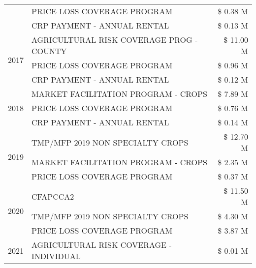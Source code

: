 \begin{tabular}{llr}
 & PRICE LOSS COVERAGE PROGRAM & \$ 0.38 M \\
 & CRP PAYMENT - ANNUAL RENTAL & \$ 0.13 M \\
\cline{1-3}
\multirow[t]{3}{*}{2017} & AGRICULTURAL RISK COVERAGE PROG - COUNTY & \$ 11.00 M \\
 & PRICE LOSS COVERAGE PROGRAM & \$ 0.96 M \\
 & CRP PAYMENT - ANNUAL RENTAL & \$ 0.12 M \\
\cline{1-3}
\multirow[t]{3}{*}{2018} & MARKET FACILITATION PROGRAM - CROPS & \$ 7.89 M \\
 & PRICE LOSS COVERAGE PROGRAM & \$ 0.76 M \\
 & CRP PAYMENT - ANNUAL RENTAL & \$ 0.14 M \\
\cline{1-3}
\multirow[t]{3}{*}{2019} & TMP/MFP 2019 NON SPECIALTY CROPS & \$ 12.70 M \\
 & MARKET FACILITATION PROGRAM - CROPS & \$ 2.35 M \\
 & PRICE LOSS COVERAGE PROGRAM & \$ 0.37 M \\
\cline{1-3}
\multirow[t]{3}{*}{2020} & CFAPCCA2 & \$ 11.50 M \\
 & TMP/MFP 2019 NON SPECIALTY CROPS & \$ 4.30 M \\
 & PRICE LOSS COVERAGE PROGRAM & \$ 3.87 M \\
\cline{1-3}
2021 & AGRICULTURAL RISK COVERAGE - INDIVIDUAL & \$ 0.01 M \\
\cline{1-3}
\bottomrule
\end{tabular}
